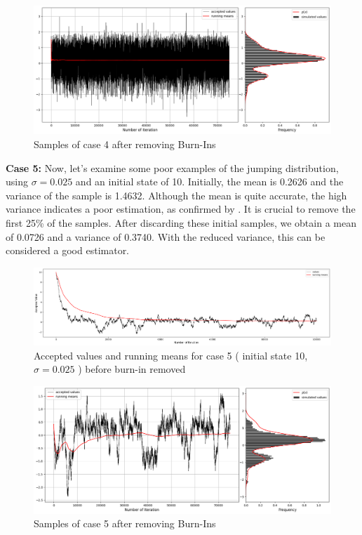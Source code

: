 \begin{example}
    \begin{figure}[H]
        \centering
        \includegraphics[width=1\textwidth]{./images/metropolis/sample-4-value-hist-bo.png}
        \caption{Samples of case 4 after removing Burn-Ins}
    \end{figure}

    \textbf{Case 5:}  Now, let's examine some poor examples of the jumping distribution, using $\sigma = 0.025$ and an initial state of 10. Initially, the mean is 0.2626 and the variance of the sample is 1.4632. Although the mean is quite accurate, the high variance indicates a poor estimation, as confirmed by . It is crucial to remove the first 25\% of the samples. After discarding these initial samples, we obtain a mean of 0.0726 and a variance of 0.3740. With the reduced variance, this can be considered a good estimator.

    \begin{figure}[H]
        \centering
        \includegraphics[width=1\textwidth]{./images/metropolis/sample-5-values.png}
        \caption{Accepted values and running means for case 5 ( initial state 10, $ \sigma = 0.025 $ ) before burn-in removed}
        \label{fig:MH sample5}
    \end{figure}
    
    \begin{figure}[H]
        \centering
        \includegraphics[width=1\textwidth]{./images/metropolis/sample-5-value-hist-bo.png}
        \caption{Samples of case 5 after removing Burn-Ins}
    \end{figure}


\end{example}
